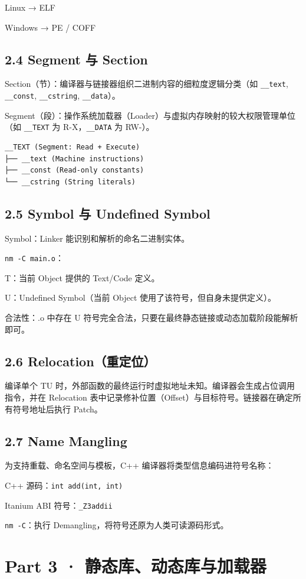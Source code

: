 \documentclass[11pt,a4paper]{article}
\begin{document}
Linux → ELF

Windows → PE / COFF

\subsection{2.4 Segment 与 Section}
Section（节）：编译器与链接器组织二进制内容的细粒度逻辑分类（如 \texttt{\_\_text}, \texttt{\_\_const}, \texttt{\_\_cstring}, \texttt{\_\_data}）。

Segment（段）：操作系统加载器（Loader）与虚拟内存映射的较大权限管理单位（如 \texttt{\_\_TEXT} 为 R-X，\texttt{\_\_DATA} 为 RW-）。

\begin{lstlisting}[language=text]
__TEXT (Segment: Read + Execute)
├── __text (Machine instructions)
├── __const (Read-only constants)
└── __cstring (String literals)
\end{lstlisting}
\subsection{2.5 Symbol 与 Undefined Symbol}
Symbol：Linker 能识别和解析的命名二进制实体。

\texttt{nm -C main.o}：

T：当前 Object 提供的 Text/Code 定义。

U：Undefined Symbol（当前 Object 使用了该符号，但自身未提供定义）。

合法性：.o 中存在 U 符号完全合法，只要在最终静态链接或动态加载阶段能解析即可。

\subsection{2.6 Relocation（重定位）}
编译单个 TU 时，外部函数的最终运行时虚拟地址未知。编译器会生成占位调用指令，并在 Relocation 表中记录修补位置（Offset）与目标符号。链接器在确定所有符号地址后执行 Patch。

\subsection{2.7 Name Mangling}
为支持重载、命名空间与模板，C++ 编译器将类型信息编码进符号名称：

C++ 源码：\texttt{int add(int, int)}

Itanium ABI 符号：\texttt{\_Z3addii}

\texttt{nm -C}：执行 Demangling，将符号还原为人类可读源码形式。

\section{Part 3 · 静态库、动态库与加载器}
\end{document}
